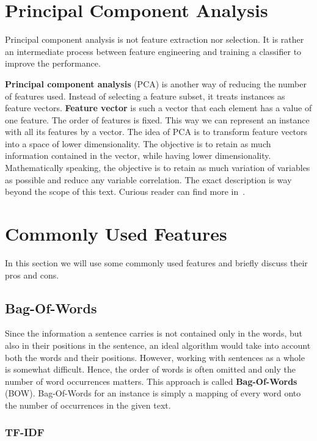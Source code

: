 \section{Principal Component Analysis}

Principal component analysis is not feature extraction nor selection.
It is rather an intermediate process between feature engineering and training a classifier
to improve the performance.

\textbf{Principal component analysis} (PCA) is another way of reducing the number of features used.
Instead of selecting a feature subset, it treats instances as feature vectors.
\textbf{Feature vector} is such a vector that each element has a value of one feature.
The order of features is fixed.
This way we can represent an instance with all its features by a vector.
The idea of PCA is to transform feature vectors into a space of lower dimensionality.
The objective is to retain as much information contained in the vector, while
having lower dimensionality.
Mathematically speaking, the objective is to retain as much variation of variables
as possible and reduce any variable correlation.
The exact description is way beyond the scope of this text.
Curious reader can find more in~\citet{Jolliffe02}.

\section{Commonly Used Features}

In this section we will use some commonly used features and briefly discuss their pros and cons.

\subsection{Bag-Of-Words}
\label{subsec:bow}

Since the information a sentence carries is not contained only in the words, but also in their positions in the sentence, an ideal algorithm would take into account both the words and their positions.
However, working with sentences as a whole is somewhat difficult. Hence, the order of words is often omitted and only the number of word occurrences matters.
This approach is called {\bf Bag-Of-Words} (BOW). Bag-Of-Words for an instance is simply a mapping of every word onto the number of occurrences in the given text.

\subsubsection{TF-IDF}

